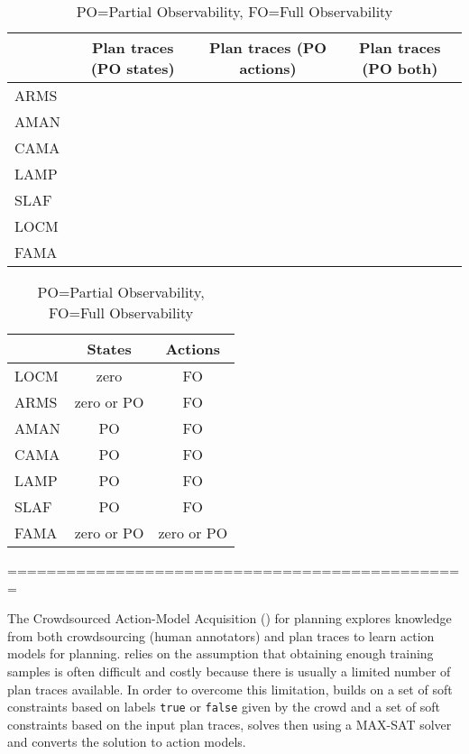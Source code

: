 \begin{table}
	\small
	\centering
	\begin{tabular}{ l | c | c | c |}
		& \multicolumn{1}{|p{2cm}|}{Plan traces (PO states)}
		& \multicolumn{1}{|p{2cm}|}{Plan traces (PO actions)}
		& \multicolumn{1}{|p{2cm}|}{Plan traces (PO both)}   \\
		\hline			
		ARMS & \checkmark & & \\
		AMAN & \checkmark & & \\
		CAMA & \checkmark & & \\
		LAMP & \checkmark & & \\
		SLAF & \checkmark & & \\
		LOCM & \checkmark & & \\
		FAMA & \checkmark & \checkmark & \checkmark \\
	\end{tabular}
	\caption{PO=Partial Observability, FO=Full Observability}
	\label{table:input_comparison2}
\end{table}	


\begin{table}
	\small
	\centering
	\begin{tabular}{ l | c | c |}
		& States
		& Actions  \\
		\hline
		LOCM & zero & FO\\		
		ARMS & zero or PO & FO \\
		AMAN & PO & FO \\
		CAMA & PO & FO \\
		LAMP & PO & FO \\
		SLAF & PO & FO \\		
		FAMA & zero or PO & zero or PO \\
	\end{tabular}
	\caption{PO=Partial Observability, FO=Full Observability}
	\label{table:input_comparison3}
\end{table}	

===============================================


The Crowdsourced Action-Model Acquisition (\CAMA) for planning explores knowledge from both crowdsourcing (human annotators) and plan traces to learn action models for planning. \CAMA relies on the assumption that obtaining enough training samples is often difficult and costly because there is usually a limited number of plan traces available. In order to overcome this limitation, \CAMA builds on a set of soft constraints based on labels \texttt{true} or \texttt{false} given by the crowd and a set of soft constraints based on the input plan traces, solves then using a MAX-SAT solver and converts the solution to action models.


